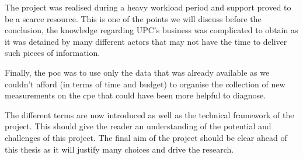 The project was realised during a heavy workload period and support proved to be a scarce resource. This is one of the points we will discuss before the conclusion, the knowledge regarding UPC's business was complicated to obtain as it was detained by many different actors that may not have the time to deliver such pieces of information. 

Finally, the \acrshort{poc} was to use only the data that was already available as we couldn't afford (in terms of time and budget) to organise the collection of new measurements on the \acrshort{cpe} that could have been more helpful to diagnose.

\vspace{1\baselineskip}
The different terms are now introduced as well as the technical framework of the project. This should give the reader an understanding of the potential and challenges of this project. The final aim of the project should be clear ahead of this thesis as it will justify many choices and drive the research.

